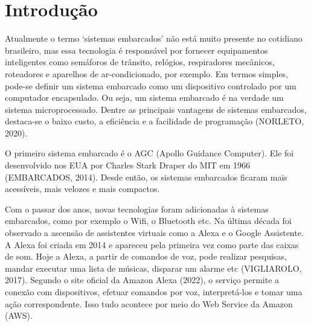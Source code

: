 \documentclass[
    12pt,
    openright,
    twoside,
    a4paper,
    english,
    spanish,
    brazil,
    ]{abntex2}
\begin{document}
\frenchspacing


\imprimircapa

\imprimirfolhaderosto

\begin{dedicatoria}
\end{dedicatoria}

\begin{agradecimentos}
\end{agradecimentos}

\tableofcontents*
\cleardoublepage

\textual

\chapter{Introdução}
Atualmente o termo ‘sistemas embarcados’ não está muito presente no cotidiano brasileiro, mas essa tecnologia é responsável por fornecer equipamentos inteligentes como semáforos de trânsito, relógios, respiradores mecânicos, roteadores e aparelhos de ar-condicionado, por exemplo. Em termos simples, pode-se definir um sistema embarcado como um dispositivo controlado por um computador encapsulado. Ou seja, um sistema embarcado é na verdade um sistema microprocessado. Dentre as principais vantagens de sistemas embarcados, destaca-se o baixo custo, a eficiência e a facilidade de programação (NORLETO, 2020).

O primeiro sistema embarcado é o AGC (Apollo Guidance Computer). Ele foi desenvolvido nos EUA por Charles Stark Draper do MIT em 1966 (EMBARCADOS, 2014). Desde então, os sistemas embarcados ficaram mais acessíveis, mais velozes e mais compactos.

Com o passar dos anos, novas tecnologias foram adicionadas à sistemas embarcados, como por exemplo o Wifi, o Bluetooth etc. Na última década foi observado a ascensão de assistentes virtuais como a Alexa e o Google Assistente. A Alexa foi criada em 2014 e apareceu pela primeira vez como parte das caixas de som. Hoje a Alexa, a partir de comandos de voz, pode realizar pesquisas, mandar executar uma lista de músicas, disparar um alarme etc (VIGLIAROLO, 2017). Segundo o site oficial da Amazon Alexa (2022), o serviço permite a conexão com dispositivos, efetuar comandos por voz, interpretá-los e tomar uma ação correspondente. Isso tudo acontece por meio do Web Service da Amazon (AWS).
\end{document}
